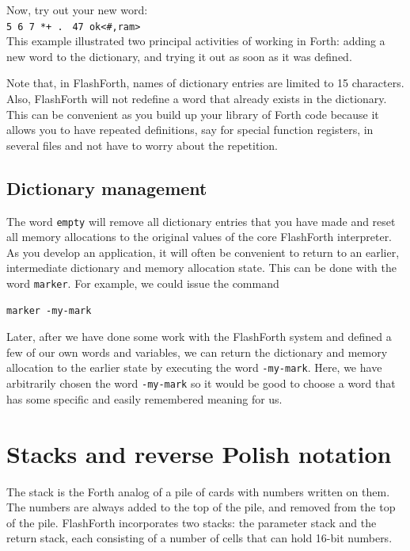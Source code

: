 \documentclass[12pt,a4paper]{article}
\begin{document}
\medskip
Now, try out your new word: \vspace{7pt} \\
\verb!5 6 7 *+ .! \fbox{$\hookleftarrow$} \verb! 47 ok<#,ram>! \vspace{7pt} \\
This example illustrated two principal activities of working in Forth:
adding a new word to the dictionary, and trying it out as soon as it was defined.

\medskip
Note that, in FlashForth, names of dictionary entries are limited to 15 characters.
Also, FlashForth will not redefine a word that already exists in the dictionary.
This can be convenient as you build up your library of Forth code because it allows
you to have repeated definitions, say for special function registers, in several files
and not have to worry about the repetition.

\medskip
\subsection{Dictionary management}
%
The word \verb!empty! will remove all dictionary entries that you have made and
reset all memory allocations to the original values of the core FlashForth interpreter.
As you develop an application, it will often be convenient to return to an earlier, intermediate 
dictionary and memory allocation state. 
This can be done with the word \verb!marker!.
For example, we could issue the command
\begin{verbatim}
marker -my-mark
\end{verbatim}
Later, after we have done some work with the FlashForth system and defined a few of our own words and variables,
we can return the dictionary and memory allocation to the earlier state by executing the word \verb!-my-mark!.
Here, we have arbitrarily chosen the word \verb!-my-mark! so it would be good to choose a word that has
some specific and easily remembered meaning for us.


\bigskip
\section{Stacks and reverse Polish notation}
\label{sec:stacks-and-rpn}
%
The stack is the Forth analog of a pile of cards with numbers written on them.
The numbers are always added to the top of the pile, and removed from the top of the pile.
FlashForth incorporates two stacks: the parameter stack and the return stack,
each consisting of a number of cells that can hold 16-bit numbers.
\end{document}
